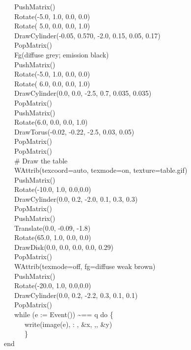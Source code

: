 \documentclass[letterpaper]{article}
\begin{document}
{{\ \ \ PushMatrix()\\
\ \ \ Rotate(-5.0, 1.0, 0.0, 0.0)\\
\ \ \ Rotate( 5.0, 0.0, 0.0, 1.0)\\
\ \ \ DrawCylinder(-0.05, 0.570, -2.0, 0.15, 0.05, 0.17)\\
\ \ \ PopMatrix()\\
\ \ \ Fg({\textquotedbl}diffuse grey; emission black{\textquotedbl})\\
\ \ \ PushMatrix()\\
\ \ \ Rotate(-5.0, 1.0, 0.0, 0.0)\\
\ \ \ Rotate( 6.0, 0.0, 0.0, 1.0)\\
\ \ \ DrawCylinder(0.0, 0.0, -2.5, 0.7, 0.035, 0.035)\\
\ \ \ PopMatrix()\\
\ \ \ PushMatrix()\\
\ \ \ Rotate(6.0, 0.0, 0.0, 1.0)\\
\ \ \ DrawTorus(-0.02, -0.22, -2.5, 0.03, 0.05)\\
\ \ \ PopMatrix() \\
\ \ \ PopMatrix()\\
\ \ \ \# Draw the table \\
\ \ \ WAttrib({\textquotedbl}texcoord=auto{\textquotedbl}, {\textquotedbl}texmode=on{\textquotedbl}, {\textquotedbl}texture=table.gif{\textquotedbl})\\
\ \ \ PushMatrix()\\
\ \ \ Rotate(-10.0, 1.0, 0.0,0.0)\\
\ \ \ DrawCylinder(0.0, 0.2, -2.0, 0.1, 0.3, 0.3)\\
\ \ \ PopMatrix()\\
\ \ \ PushMatrix()\\
\ \ \ Translate(0.0, -0.09, -1.8)\\
\ \ \ Rotate(65.0, 1.0, 0.0, 0.0)\\
\ \ \ DrawDisk(0.0, 0.0, 0.0, 0.0, 0.29) \\
\ \ \ PopMatrix()\\
\ \ \ WAttrib({\textquotedbl}texmode=off{\textquotedbl}, {\textquotedbl}fg=diffuse weak brown{\textquotedbl})\\
\ \ \ PushMatrix()\\
\ \ \ Rotate(-20.0, 1.0, 0.0,0.0)\\
\ \ \ DrawCylinder(0.0, 0.2, -2.2, 0.3, 0.1, 0.1)\\
\ \ \ PopMatrix()\\
\ \ \ while (e := Event()) \~{}== {\textquotedbl}q{\textquotedbl} do \{}\\
\ \ \ \ \ \ write(image(e), {\textquotedbl}: {\textquotedbl}, \&x, {\textquotedbl},{\textquotedbl}, \&y)\\
\ \ \ \ \ \ \}\\
end
}
\end{document}
